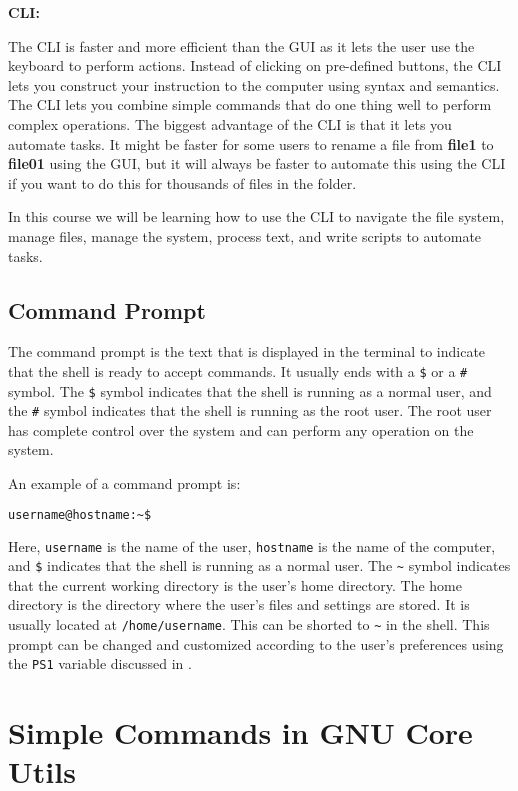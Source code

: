 \textbf{CLI:}

The CLI is faster and more efficient than the GUI as it lets the user use the keyboard to perform actions.
Instead of clicking on pre-defined buttons, the CLI lets you construct your instruction to the computer using syntax and semantics.
The CLI lets you combine simple commands that do one thing well to perform complex operations.
The biggest advantage of the CLI is that it lets you automate tasks.
It might be faster for some users to rename a file from \textbf{file1} to \textbf{file01} using the GUI, but it will always be faster to automate this using the CLI if you want to do this for thousands of files in the folder.

In this course we will be learning how to use the CLI to navigate the file system, manage files, manage the system, process text, and write scripts to automate tasks.

\subsection{Command Prompt}

The command prompt is the text that is displayed in the terminal to indicate that the shell is ready to accept commands. It usually ends with a \lstinline|$| or a \lstinline|#| symbol. The \lstinline|$| symbol indicates that the shell is running as a normal user, and the \lstinline|#| symbol indicates that the shell is running as the root user. The root user has complete control over the system and can perform any operation on the system.

An example of a command prompt is:

\begin{lstlisting}[language=bash]
  username@hostname:~$
\end{lstlisting}

Here, \lstinline|username| is the name of the user, \lstinline|hostname| is the name of the computer, and \lstinline|$| indicates that the shell is running as a normal user.
The \lstinline|~| symbol indicates that the current working directory is the user's home directory.
The home directory is the directory where the user's files and settings are stored.
It is usually located at \lstinline|/home/username|.
This can be shorted to \lstinline|~| in the shell.
This prompt can be changed and customized according to the user's preferences using the \lstinline|PS1| variable discussed in .

\vfill
\pagebreak
\section{Simple Commands in GNU Core Utils}

